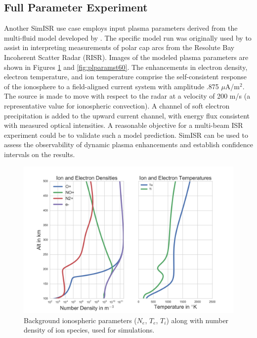 \documentclass[draft,ras]{agutex}
\begin{document}
\begin{article}
\subsection{Full Parameter Experiment}
\label{sec:fullparam}
Another SimISR use case employs input plasma parameters derived from the multi-fluid model developed by \cite{semeter:plasmatransport2012}. The specific model run was originally used by \cite{Perry:2015jf} to assist in interpreting measurements of polar cap arcs from the Resolute Bay Incoherent Scatter Radar (RISR). Images of the modeled plasma parameters are shown in Figures \ref{fig:plparamst0} and \ref{fig:plparamst60}. The enhancements in electron density, electron temperature, and ion temperature comprise the self-consistent response of the ionosphere to a field-aligned current system with amplitude .875 $\mu$A/m$^2$.  The source is made to move with respect to the radar at a velocity of 200 m/s (a representative value for ionospheric convection).  A channel of soft electron precipitation is added to the upward current channel, with energy flux consistent with measured optical intensities.  A reasonable objective for a multi-beam ISR experiment could be to validate such a model prediction.  SimISR can be used to assess the observability of dynamic plasma enhancements and establish confidence intervals on the results.  

\begin{figure}[!t]
\centering
\includegraphics[width=6in]{backgroundallparams}
\caption{Background ionospheric parameters ($N_e$, $T_e$, $T_i$) along with number density of ion species, used for simulations.}
\label{fig:plparamst0}
\end{figure}


\end{article}
\end{document}

